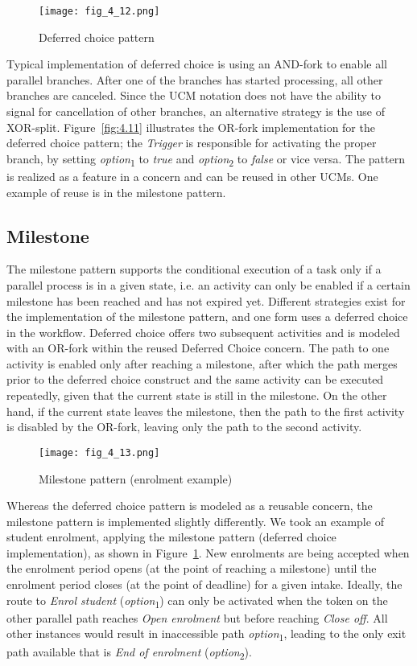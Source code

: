 \begin{figure}[h]
	\centering
	\texttt{[image: fig\_4\_12.png]}
	\caption{Deferred choice pattern}
	\label{fig:4.12}
\end{figure}

Typical implementation of deferred choice is using an AND-fork to enable all parallel branches. After one of the branches has started processing, all other branches are canceled. Since the UCM notation does not have the ability to signal for cancellation of other branches, an alternative strategy is the use of XOR-split. Figure~\ref{fig:4.11} illustrates the OR-fork implementation for the deferred choice pattern; the \emph{Trigger} is responsible for activating the proper branch, by setting \emph{option}\textsubscript{1} to \emph{true} and \emph{option}\textsubscript{2} to \emph{false} or vice versa. The pattern is realized as a feature in a concern and can be reused in other UCMs. One example of reuse is in the milestone pattern.

\subsection{Milestone}

The milestone pattern supports the conditional execution of a task only if a parallel process is in a given state, i.e. an activity can only be enabled if a certain milestone has been reached and has not expired yet. Different strategies exist for the implementation of the milestone pattern, and one form uses a deferred choice in the workflow. Deferred choice offers two subsequent activities and is modeled with an OR-fork within the reused Deferred Choice concern. The path to one activity is enabled only after reaching a milestone, after which the path merges prior to the deferred choice construct and the same activity can be executed repeatedly, given that the current state is still in the milestone. On the other hand, if the current state leaves the milestone, then the path to the first activity is disabled by the OR-fork, leaving only the path to the second activity.

\begin{figure}
	\centering
	\texttt{[image: fig\_4\_13.png]}
	\caption{Milestone pattern (enrolment example)}
	\label{fig:4.13}
\end{figure}

Whereas the deferred choice pattern is modeled as a reusable concern, the milestone pattern is implemented slightly differently. We took an example of student enrolment, applying the milestone pattern (deferred choice implementation), as shown in Figure~\ref{fig:4.12}. New enrolments are being accepted when the enrolment period opens (at the point of reaching a milestone) until the enrolment period closes (at the point of deadline) for a given intake. Ideally, the route to \emph{Enrol student} (\emph{option}\textsubscript{1}) can only be activated when the token on the other parallel path reaches \emph{Open enrolment} but before reaching \emph{Close off}. All other instances would result in inaccessible path \emph{option}\textsubscript{1}, leading to the only exit path available that is \emph{End of enrolment} (\emph{option}\textsubscript{2}).


